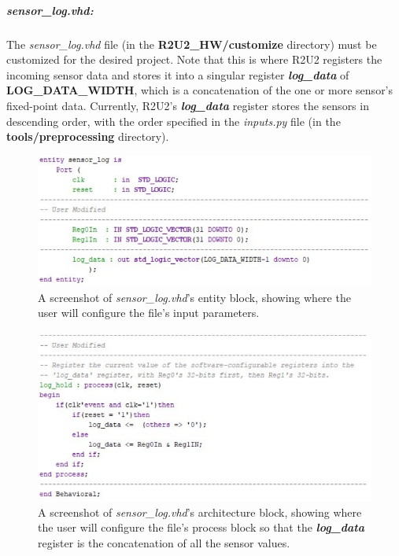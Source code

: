 \subparagraph{sensor\_log.vhd:} The \textit{sensor\_log.vhd} file (in the \textbf{R2U2\_HW/customize} directory) must be customized for the desired project. Note that this is where R2U2 registers the incoming sensor data and stores it into a singular register \textit{\textbf{log\_data}} of \textbf{LOG\_DATA\_WIDTH}, which is a concatenation of the one or more sensor's fixed-point data. Currently, R2U2's \textit{\textbf{log\_data}} register stores the sensors in descending order, with the order specified in the \textit{inputs.py} file (in the \textbf{tools/preprocessing} directory). 

\begin{figure}[H]
	\begin{center}
	\includegraphics[scale=0.5]{fig/r2u2_hw_sensorLog_entity.pdf}
	\caption{A screenshot of \textit{sensor\_log.vhd}'s entity block, showing where the user will configure the file's input parameters. 
	\label{fig:r2u2hwSLentity}} 
	\end{center}
\end{figure}

\begin{figure}[H]
	\begin{center}
	\includegraphics[scale=0.5]{fig/r2u2_hw_sensorLog_arch.pdf}
	\caption{A screenshot of \textit{sensor\_log.vhd}'s architecture block, showing where the user will configure the file's process block so that the \textit{\textbf{log\_data}} register is the concatenation of all the sensor values. 
	\label{fig:r2u2hwSLarch}} 
	\end{center}
\end{figure}

